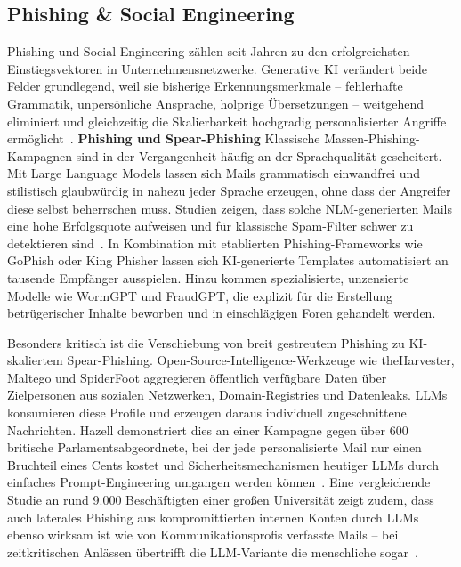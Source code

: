 \documentclass[conference]{IEEEtran}
\begin{document}
\subsection{Phishing \& Social Engineering}
Phishing und Social Engineering zählen seit Jahren zu den erfolgreichsten Einstiegsvektoren in Unternehmensnetzwerke. Generative KI verändert beide Felder grundlegend, weil sie bisherige Erkennungsmerkmale -- fehlerhafte Grammatik, unpersönliche Ansprache, holprige Übersetzungen -- weitgehend eliminiert und gleichzeitig die Skalierbarkeit hochgradig personalisierter Angriffe ermöglicht~\cite{hazell_spear_2023,_social_2025}.
\newline
\newline
\textbf{Phishing und Spear-Phishing}
\newline
Klassische Massen-Phishing-Kampagnen sind in der Vergangenheit häufig an der Sprachqualität gescheitert. Mit Large Language Models lassen sich Mails grammatisch einwandfrei und stilistisch glaubwürdig in nahezu jeder Sprache erzeugen, ohne dass der Angreifer diese selbst beherrschen muss. Studien zeigen, dass solche NLM-generierten Mails eine hohe Erfolgsquote aufweisen und für klassische Spam-Filter schwer zu detektieren sind~\cite{karanjai_targeted_2023}. In Kombination mit etablierten Phishing-Frameworks wie GoPhish oder King Phisher lassen sich KI-generierte Templates automatisiert an tausende Empfänger ausspielen. Hinzu kommen spezialisierte, unzensierte Modelle wie WormGPT und FraudGPT, die explizit für die Erstellung betrügerischer Inhalte beworben und in einschlägigen Foren gehandelt werden.
\newline %

Besonders kritisch ist die Verschiebung von breit gestreutem Phishing zu KI-skaliertem Spear-Phishing. Open-Source-Intelligence-Werkzeuge wie theHarvester, Maltego und SpiderFoot aggregieren öffentlich verfügbare Daten über Zielpersonen aus sozialen Netzwerken, Domain-Registries und Datenleaks. LLMs konsumieren diese Profile und erzeugen daraus individuell zugeschnittene Nachrichten. Hazell demonstriert dies an einer Kampagne gegen über 600 britische Parlamentsabgeordnete, bei der jede personalisierte Mail nur einen Bruchteil eines Cents kostet und Sicherheitsmechanismen heutiger LLMs durch einfaches Prompt-Engineering umgangen werden können~\cite{hazell_spear_2023}. Eine vergleichende Studie an rund 9.000 Beschäftigten einer großen Universität zeigt zudem, dass auch laterales Phishing aus kompromittierten internen Konten durch LLMs ebenso wirksam ist wie von Kommunikationsprofis verfasste Mails -- bei zeitkritischen Anlässen übertrifft die LLM-Variante die menschliche sogar~\cite{bethany_lateral_2025}.
\newline
\end{document}
